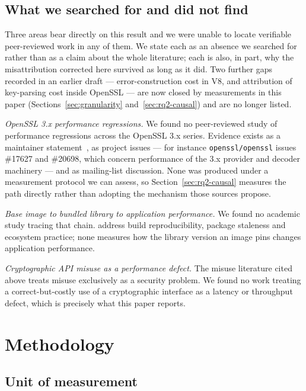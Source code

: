 \documentclass[pdflatex,sn-basic,twocolumn]{sn-jnl}%
\begin{document}
\subsection{What we searched for and did not find}\label{sec:gaps}

Three areas bear directly on this result and we were unable to locate
verifiable peer-reviewed work in any of them. We state each as an absence we
searched for rather than as a claim about the whole literature; each is also,
in part, why the misattribution corrected here survived as long as it did. Two
further gaps recorded in an earlier draft --- error-construction cost in V8,
and attribution of key-parsing cost inside OpenSSL --- are now closed by
measurements in this paper (Sections~\ref{sec:granularity}
and~\ref{sec:rq2-causal}) and are no longer listed.

\emph{OpenSSL 3.x performance regressions.} We found no peer-reviewed study of
performance regressions across the OpenSSL 3.x series. Evidence exists as a
maintainer statement~\citep{pyca2026stateofopenssl}, as project issues --- for
instance \texttt{openssl/openssl} issues \#17627 and \#20698, which concern
performance of the 3.x provider and decoder machinery --- and as mailing-list
discussion. None was produced under a measurement protocol we can assess, so
Section~\ref{sec:rq2-causal} measures the path directly rather than adopting
the mechanism those sources propose.

\emph{Base image to bundled library to application performance.} We found no
academic study tracing that chain. \citet{malka2026docker} address
build reproducibility, \citet{zerouali2019outdated} package
staleness and \citet{cito2017empirical} ecosystem practice; none
measures how the library version an image pins changes application
performance.

\emph{Cryptographic API misuse as a performance defect.} The misuse literature
cited above treats misuse exclusively as a security problem. We found no work
treating a correct-but-costly use of a cryptographic interface as a latency or
throughput defect, which is precisely what this paper reports.

\section{Methodology}\label{sec:method}

\subsection{Unit of measurement}\label{sec:unit}
\end{document}
